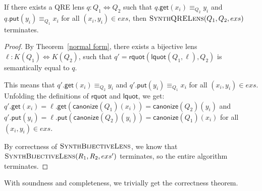 \documentclass[acmsmall,review,anonymous]{acmart}
\newcommand{\codefont}[1]{\ensuremath{\mathsf{#1}}}
\newcommand{\kw}[1]{\codefont{#1}}
\newcommand{\canonize}{\ensuremath{\kw{canonize}}}
\newcommand{\get}{\ensuremath{\kw{get}}}
\newcommand{\lput}{\ensuremath{\kw{put}}}
\newcommand{\lquot}{\ensuremath{\kw{lquot}}}
\newcommand{\rquot}{\ensuremath{\kw{rquot}}}
\begin{document}
\begin{lemma}
  If there exists a QRE lens $q : Q_1 \Leftrightarrow Q_2$ such that
  $q.\get(x_i) \equiv_{Q_2} y_i$ and $q.\lput(y_i) \equiv_{Q_1} x_i$ for all
  $(x_i,y_i)\in exs$, then $\textproc{SynthQRELens}(Q_1,Q_2,exs)$ terminates.
\end{lemma}
\begin{proof}
  By Theorem~\ref{normal form}, there exists a bijective lens $\ell : K(Q_1)
  \Leftrightarrow K(Q_2)$, such that $q' = \rquot(\lquot(Q_1, \ell), Q_2)$ is
  semantically equal to $q$.

  This means that $q'.\get(x_i) \equiv_{Q_2} y_i$ and $q'.\lput(y_i)
  \equiv_{Q_1} x_i$ for all $(x_i,y_i)\in exs$. Unfolding the definitions of
  $\rquot$ and $\lquot$, we get:\\
  $q'.\get(x_i) = \ell.\get(\canonize(Q_1)(x_i)) = \canonize(Q_2)(y_i)$ and\\
  $q'.\lput(y_i) = \ell.\lput(\canonize(Q_2)(y_i)) = \canonize(Q_1)(x_i)$ for all
  $(x_i,y_i)\in exs$.

  By correctness of $\textproc{SynthBijectiveLens}$, we know that
  $\Call{SynthBijectiveLens}{R_1,R_2,exs'}$ terminates, so the entire algorithm
  terminates. 
\end{proof}

With soundness and completeness, we trivially get the correctness theorem.
\end{document}
